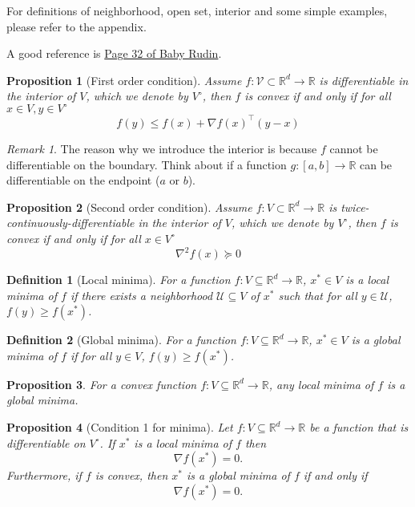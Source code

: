 \documentclass{article}
\newtheorem{definition}{Definition}
\newtheorem{proposition}{Proposition}
\newcommand{\R}{\mathbb{R}}
\DeclareMathOperator*{\1}{\mathbbm{1}}
\theoremstyle{definition}
\theoremstyle{remark}
\newtheorem{remark}{Remark}
\newcommand{\cU}{\mathcal{U}}
\newcommand{\cV}{\mathcal{V}}
\begin{document}
  \color{red}For definitions of neighborhood, open set, interior and some simple examples, please refer to the appendix.
  
  A good reference is \href{https://web.math.ucsb.edu/~agboola/teaching/2021/winter/122A/rudin.pdf}{Page 32 of Baby Rudin}.
  \color{black}
  
  \begin{proposition}[First order condition]
    Assume $f:\cV\subset \R^d\to \R$ is differentiable in the interior of $V$, which we denote by $V^\circ$, then $f$ is convex if and only if for all $x\in V, y\in V^\circ$
    \begin{equation*}
      f(y)\le f(x)+\nabla f(x)^\top (y-x)
    \end{equation*}
  \end{proposition}
  \begin{remark}
    The reason why we introduce the interior is because $f$ cannot be differentiable on the boundary. Think about if a function $g:[a,b]\to\R$ can be differentiable on the endpoint ($a$ or $b$).
  \end{remark}
  \begin{proposition}[Second order condition]
    Assume $f:V\subset \R^d\to \R$ is twice-continuously-differentiable in the interior of $V$, which we denote by $V^\circ$, then $f$ is convex if and only if for all $x\in V^\circ$
    \begin{equation*}
      \nabla^2f(x)\succeq 0
    \end{equation*}
  \end{proposition}
  \begin{definition}[Local minima]
    For a function $f:V\subseteq \R^d \to \R$, $x^*\in V$ is a local minima of $f$ if there exists a neighborhood $\cU\subseteq V$ of $x^*$ such that for all $y\in \cU$, $f(y)\ge f(x^*)$.
  \end{definition}
  \begin{definition}[Global minima]
    For a function $f:V\subseteq \R^d \to \R$, $x^*\in V$ is a global minima of $f$ if for all $y\in V$, $f(y)\ge f(x^*)$.
  \end{definition}
  \begin{proposition}
    For a convex function $f:V\subseteq \R^d \to \R$, any local minima of $f$ is a global minima.
  \end{proposition}
  \begin{proposition}[Condition 1 for minima]
    Let $f:V\subseteq \R^d \to \R$ be a function that is differentiable on $V^\circ$. If $x^*$ is a local minima of $f$ then 
    \begin{equation*}
      \nabla f(x^*)=0.
    \end{equation*}
    Furthermore, if $f$ is convex, then $x^*$ is a global minima of $f$ if and only if 
    \begin{equation*}
      \nabla f(x^*)=0.
    \end{equation*}
  \end{proposition}
\end{document}
